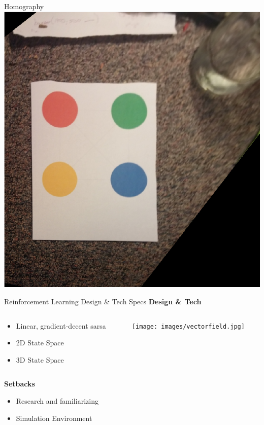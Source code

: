 \documentclass[11pt]{beamer}
\begin{document}
\begin{frame}{Homography}
	\centering
	\includegraphics[width=.66\textwidth]{images/img_reconstruction02}
\end{frame}

\begin{frame}{Reinforcement Learning Design \& Tech Specs}
\large{\textbf{Design \& Tech}}
\begin{columns}
	\begin{column}{0.47\textwidth}
	\begin{itemize}
		\item Linear, gradient-decent sarsa
		\item 2D State Space 
		\item 3D State Space
	\end{itemize}
	\end{column}
	\begin{column}{0.5\textwidth}
	\texttt{[image: images/vectorfield.jpg]}
	\end{column}
\end{columns}
\large{\textbf{Setbacks}}
	\begin{itemize}
		\item Research and familiarizing
		\item Simulation Environment
	\end{itemize}
\end{frame}
\end{document}

